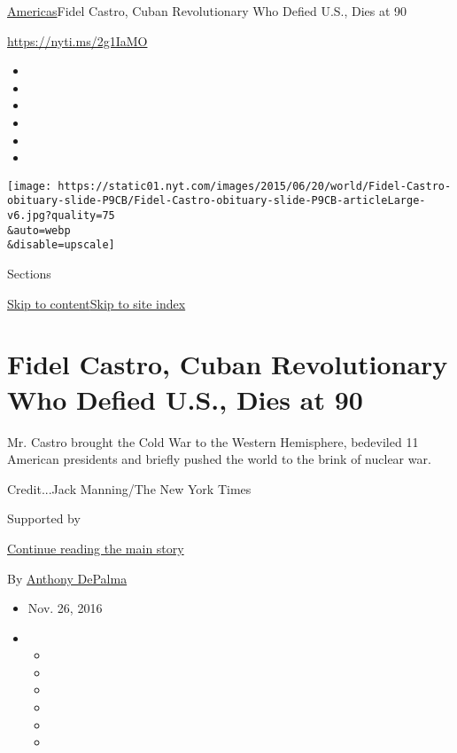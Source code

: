 \href{/section/world/americas}{Americas}\textbar{}Fidel Castro, Cuban
Revolutionary Who Defied U.S., Dies at 90

\url{https://nyti.ms/2g1IaMO}

\begin{itemize}
\item
\item
\item
\item
\item
\item
\end{itemize}

\texttt{[image: https://static01.nyt.com/images/2015/06/20/world/Fidel-Castro-obituary-slide-P9CB/Fidel-Castro-obituary-slide-P9CB-articleLarge-v6.jpg?quality=75\\\&auto=webp\\\&disable=upscale]}

Sections

\protect\hyperlink{site-content}{Skip to
content}\protect\hyperlink{site-index}{Skip to site index}

\hypertarget{fidel-castro-cuban-revolutionary-who-defied-us-dies-at-90}{%
\section{Fidel Castro, Cuban Revolutionary Who Defied U.S., Dies at
90}\label{fidel-castro-cuban-revolutionary-who-defied-us-dies-at-90}}

Mr. Castro brought the Cold War to the Western Hemisphere, bedeviled 11
American presidents and briefly pushed the world to the brink of nuclear
war.

Credit...Jack Manning/The New York Times

Supported by

\protect\hyperlink{after-sponsor}{Continue reading the main story}

By \href{http://www.nytimes.com/by/anthony-depalma}{Anthony DePalma}

\begin{itemize}
\item
  Nov. 26, 2016
\item
  \begin{itemize}
  \item
  \item
  \item
  \item
  \item
  \item
  \end{itemize}
\end{itemize}


